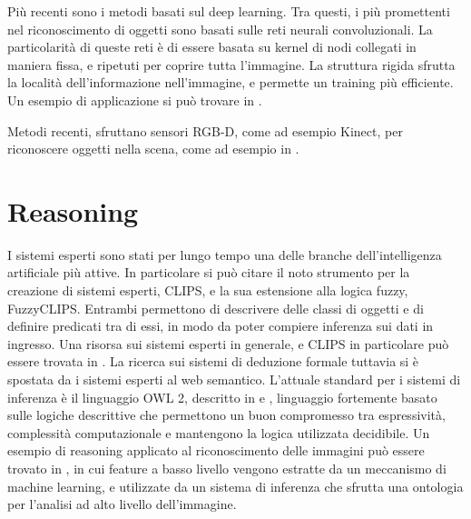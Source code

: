 Più recenti sono i metodi basati sul deep learning. Tra questi, i più promettenti nel riconoscimento di oggetti sono basati sulle reti neurali convoluzionali. La particolarità di queste reti è di essere basata su kernel di nodi collegati in maniera fissa, e ripetuti per coprire tutta l'immagine. La struttura rigida sfrutta la località dell'informazione nell'immagine, e permette un training più efficiente.
Un esempio di applicazione si può trovare in \cite{NIPS2012_4824}.

Metodi recenti, sfruttano sensori RGB-D, come ad esempio Kinect, per riconoscere oggetti nella scena, come ad esempio in \cite{lai2012detection}. 


\section{Reasoning}

I sistemi esperti sono stati per lungo tempo una delle branche dell'intelligenza artificiale più attive. 
In particolare si può citare il noto strumento per la creazione di sistemi esperti, CLIPS, e la sua estensione alla logica fuzzy, FuzzyCLIPS. Entrambi permettono di descrivere delle classi di oggetti e di definire predicati tra di essi, in modo da poter compiere inferenza sui dati in ingresso. Una risorsa sui sistemi esperti in generale, e CLIPS in particolare può essere trovata in \cite{joseph1994riley}.
La ricerca sui sistemi di deduzione formale tuttavia si è spostata da i sistemi esperti al web semantico.
L'attuale standard per i sistemi di inferenza è il linguaggio OWL 2, descritto in \cite{owl2-overview} e \cite{owl2-primer}, linguaggio fortemente basato sulle logiche descrittive che permettono un buon compromesso tra espressività, complessità computazionale e mantengono la logica utilizzata decidibile.
Un esempio di reasoning applicato al riconoscimento delle immagini può essere trovato in \cite{DBLP:journals/ivc/MaillotT08}, in cui feature a basso livello vengono estratte da un meccanismo di machine learning, e utilizzate da un sistema di inferenza che sfrutta una ontologia per l'analisi ad alto livello dell'immagine.


